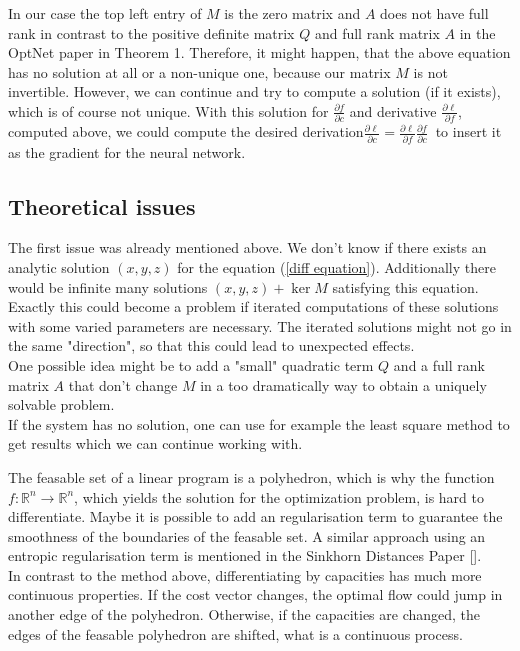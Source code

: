 \documentclass{article}
\begin{document}
In our case the top left entry of $M$ is the zero matrix and $A$ does not have full rank in contrast to the positive definite matrix $Q$ and full rank matrix $A$ in the OptNet paper in Theorem 1. Therefore, it might happen, that the above equation has no solution at all or a non-unique one, because our matrix $M$ is not invertible. However, we can continue and try to compute a solution (if it exists), which is of course not unique. With this solution for $\frac{\partial f}{\partial c}$ and derivative $\frac{\partial \ell}{\partial f}$, computed above, we could compute the desired derivation$\frac{\partial \ell }{\partial c} = \frac{\partial \ell}{\partial f} \frac{\partial f}{\partial c}~
$ to insert it as the gradient for the neural network. 

\subsection{Theoretical issues}

The first issue was already mentioned above. We don't know if there exists an analytic solution $(x,y,z)$ for the equation (\ref*{diff equation}). Additionally there would be infinite many solutions $(x,y,z)+ \ker M$ satisfying this equation. Exactly this could become a problem if iterated computations of these solutions with some varied parameters are necessary. The iterated solutions might not go in the same "direction", so that this could lead to unexpected effects. \\
One possible idea might be to add a "small" quadratic term $Q$ and a full rank matrix $A$ that don't change $M$ in a too dramatically way to obtain a uniquely solvable problem.\\
If the system has no solution, one can use for example the least square method to get results which we can continue working with.

The feasable set of a linear program is a polyhedron, which is why the function $f:\mathbb R^n \rightarrow \mathbb R^n$, which yields the solution for the optimization problem, is hard to differentiate. Maybe it is possible to add an regularisation term to guarantee the smoothness of the boundaries of the feasable set. A similar approach using an entropic regularisation term is mentioned in the Sinkhorn Distances Paper []. \\
In contrast to the method above, differentiating by capacities has much more continuous properties. If the cost vector changes, the optimal flow could jump in another edge of the polyhedron. Otherwise, if the capacities are changed, the edges of the feasable polyhedron are shifted, what is a continuous process.
\end{document}
